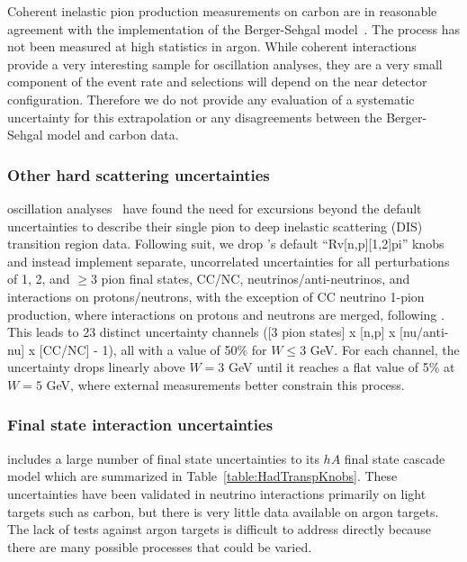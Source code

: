 Coherent inelastic pion production measurements on carbon are in reasonable agreement with the  implementation of the Berger-Sehgal model~\cite{Mislivec:2017qfz}.  The process has not been measured at high statistics in argon. While coherent interactions provide a very interesting sample for oscillation analyses, they are a very small component of the event rate and selections will depend on the near detector configuration. Therefore we do not provide any evaluation of a systematic uncertainty for this extrapolation or any disagreements between the Berger-Sehgal model and carbon data.

\subsubsection{Other hard scattering uncertainties}
\nova oscillation analyses~\cite{nova_2018} have found the need for excursions beyond the default  uncertainties to describe their single pion to deep inelastic scattering (DIS) transition region data.  Following suit, we drop 's default ``Rv[n,p][1,2]pi'' knobs and instead implement separate, uncorrelated uncertainties for all perturbations of 1, 2, and $\geq 3$ pion final states, CC/NC, neutrinos/anti-neutrinos, and interactions on protons/neutrons, with the exception of CC neutrino 1-pion production, where interactions on protons and neutrons are merged, following \cite{Rodrigues:2016xjj}. This leads to 23 distinct uncertainty channels ([3 pion states] x [n,p] x [nu/anti-nu] x [CC/NC] - 1), all with a value of 50\% for $W \leq 3$ GeV.  For each channel, the uncertainty drops linearly above $W = 3$ GeV until it reaches a flat value of 5\% at $W = 5$ GeV, where external measurements better constrain this process.

\subsubsection{Final state interaction uncertainties}\label{sec:fsi}
 includes a large number of final state uncertainties to its $hA$ final state cascade model which are summarized in Table~\ref{table:HadTranspKnobs}.  These uncertainties have been validated in neutrino interactions primarily on light targets such as carbon, but there is very little data available on argon targets.
The lack of tests against argon targets is difficult to address directly because there are many possible  processes that could be varied.




